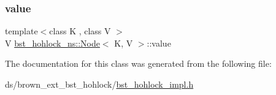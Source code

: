 \mbox{\label{classbst__hohlock__ns_1_1Node_a126d8d12e8ed894bad584a5e9df85506}} 
\subsubsection{\texorpdfstring{value}{value}}
{\footnotesize\ttfamily template$<$class K , class V $>$ \\
V \hyperlink{classbst__hohlock__ns_1_1Node}{bst\+\_\+hohlock\+\_\+ns\+::\+Node}$<$ K, V $>$\+::value}



The documentation for this class was generated from the following file\+:\begin{DoxyCompactItemize}
\item 
ds/brown\+\_\+ext\+\_\+bst\+\_\+hohlock/\hyperlink{bst__hohlock__impl_8h}{bst\+\_\+hohlock\+\_\+impl.\+h}\end{DoxyCompactItemize}
